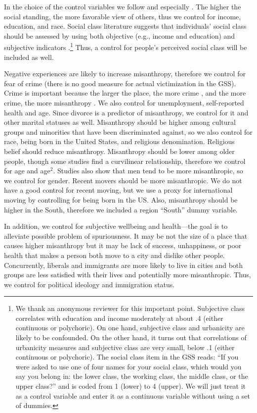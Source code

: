 \documentclass[10pt, letterpaper]{article}
\begin{document}
\begin{spacing}{1.4}
In the choice of the control variables we follow \citet{welch07} and especially
\citet{smith97}.
The higher the social standing, the more favorable view of others, thus we control
for income, education, and race. Social class literature suggests that individuals' social class should be assessed by using both objective (e.g., income and education) and subjective indicators \citep[e.g.,][]{kraus09}.\footnote{We thank an anonymous reviewer for this important point. Subjective class correlates with education and income moderately at about .4 (either continuous or polychoric). On one hand, subjective class and urbanicity are likely to be confounded. On the other hand, it turns out that correlations of urbanicity measures and subjective class are very small, below .1 (either continuous or polychoric). The social class item in the GSS reads: ``If you were asked to use one of four names for your social class, which would you say you belong in: the lower class, the working class, the middle class, or the upper class?'' and is coded from 1 (lower) to 4 (upper). We will just treat it as a control variable and enter it as a continuous variable without using a set of dummies.} Thus, a control for people's perceived social class will be included as well. 

Negative experiences are likely to increase misanthropy, therefore we control for fear of crime (there is no good measure for actual victimization in the GSS). Crime is important because the larger the place, the more crime \citep{bettencourt10b}, and the more crime, the more misanthropy \citep{wilson85}. We also control for unemployment, self-reported health and age. Since divorce is a predictor of misanthropy, we control for it and other marital statuses as well.  Misanthropy should be higher among cultural groups and minorities that have been discriminated against, so we also control for race, being born in the United States, and religious denomination. Religious belief should reduce misanthropy. Misanthropy should be lower among older people, though some studies find a curvilinear relationship, therefore we control for age and age$^2$. Studies also show that men tend to be more misanthropic, so we control for gender. Recent movers should be more misanthropic. We do not have a good control for recent moving, but we use a proxy for international moving by controlling for being born in the US. Also, misanthropy should be higher in the South, therefore we included a region ``South'' dummy variable.

In addition, we control for subjective wellbeing and health---the goal is to alleviate possible problem of spuriousness. It may be not the size of a place that causes higher misanthropy but it may be lack of success, unhappiness, or poor health that makes a person both move to a city and dislike other people. Concurrently, liberals and immigrants are more likely to live in cities and both groups are less satisfied with their lives \citep{aok11a,aokJap14} and potentially more misanthropic. Thus, we control for political ideology and immigration status.



\end{spacing}
\end{document}
